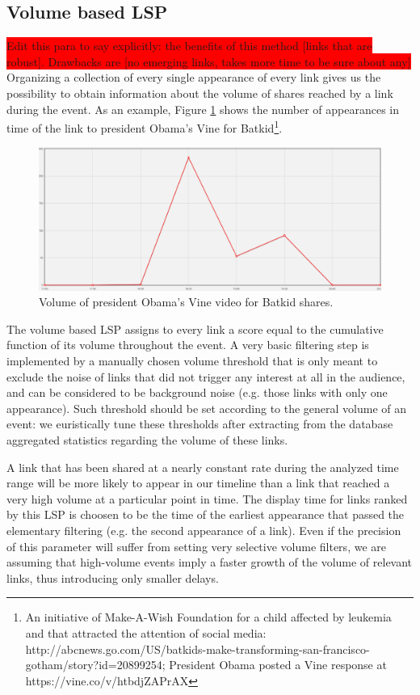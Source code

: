 \documentclass{sig-alternate}
\newcommand{\todo}[1]{\colorbox{red}{#1}}
\begin{document}
\subsection{Volume based LSP}
\label{sec:volume_based_links_selection}
\todo{Edit this para to say explicitly: the benefits of this method [links that are robust]. Drawbacks are [no emerging links, takes more time to be sure about any]}
Organizing a collection of every single appearance of every link gives us the possibility to obtain information about the volume of shares reached by a link during the event. As an example, Figure \ref{fig:batkid_whitehouse_volume} shows the number of appearances in time of the link to president Obama's Vine for Batkid\footnote{An initiative of Make-A-Wish Foundation for a child affected by leukemia and that attracted the attention of social media: http://abcnews.go.com/US/batkids-make-transforming-san-francisco-gotham/story?id=20899254; President Obama posted a Vine response at https://vine.co/v/htbdjZAPrAX}.
\begin{figure}[htbp]
  \centering
  \includegraphics[width=\linewidth]{Figures/batkid_whitehouse_volume.png}
  \caption{Volume of president Obama's Vine video for Batkid shares.}
  \label{fig:batkid_whitehouse_volume}
\end{figure}

The volume based LSP assigns to every link a score equal to the cumulative function of its volume throughout the event. A very basic filtering step is implemented by a manually chosen volume threshold that is only meant to exclude the noise of links that did not trigger any interest at all in the audience, and can be considered to be background noise (e.g. those links with only one appearance). Such threshold should be set according to the general volume of an event: we euristically tune these thresholds after extracting from the database aggregated statistics regarding the volume of these links. 

A link that has been shared at a nearly constant rate during the analyzed time range will be more likely to appear in our timeline than a link that reached a very high volume at a particular point in time. The display time for links ranked by this LSP is choosen to be the time of the earliest appearance that passed the elementary filtering (e.g. the second appearance of a link). Even if the precision of this parameter will suffer from setting very selective volume filters, we are assuming that high-volume events imply a faster growth of the volume of relevant links, thus introducing only smaller delays.
\end{document}
